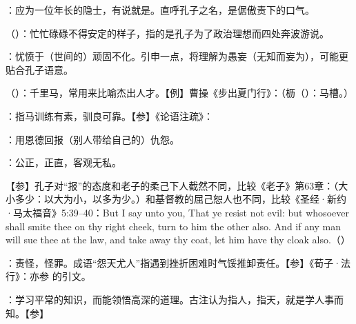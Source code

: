 {
\item {}：应为一位年长的隐士，有说就是。直呼孔子之名，是倨傲责下的口气。
\item {}（）：忙忙碌碌不得安定的样子，指的是孔子为了政治理想而四处奔波游说。
\item {}：忧愤于（世间的）顽固不化。引申一点，将理解为愚妄（无知而妄为），可能更贴合孔子语意。
}
{}


{
\item {}（）：千里马，常用来比喻杰出人才。【例】曹操《步出夏门行》：（枥（）：马槽。）
\item {}：指马训练有素，驯良可靠。【参】《论语注疏》：
}
{}


{
\begin{lyitemize}
\item {}：用恩德回报（别人带给自己的）仇怨。
\item {}：公正，正直，客观无私。
\end{lyitemize}
【参】孔子对“报”的态度和老子的柔己下人截然不同，比较《老子》第63章：（大小多少：以大为小，以多为少。）和基督教的屈己恕人也不同，比较《圣经·新约·马太福音》5:39--40：But I say unto you, That ye resist not evil: but whosoever shall smite thee on thy right cheek, turn to him the other also. And if any man will sue thee at the law, and take away thy coat, let him have thy cloak also.（）
}
{}


{
\item {}：责怪，怪罪。成语“怨天尤人”指遇到挫折困难时气馁推卸责任。【参】《荀子·法行》：亦参  的引文。
\item {}：学习平常的知识，而能领悟高深的道理。古注认为指人，指天，就是学人事而知。【参】
}
{}


